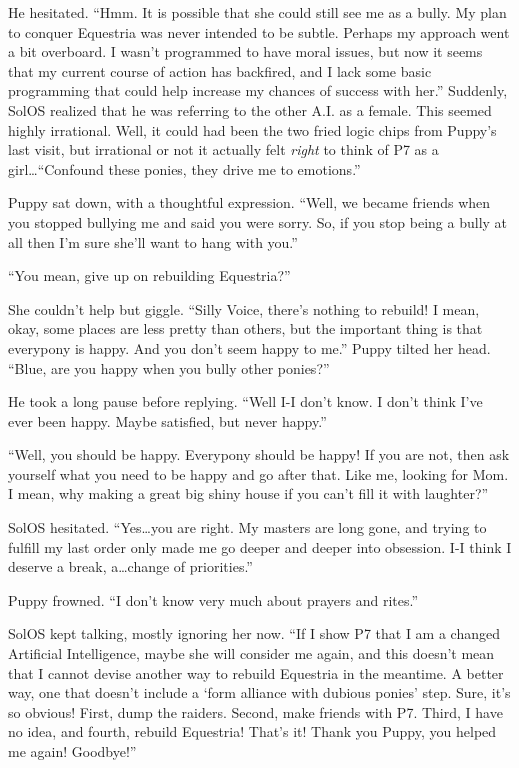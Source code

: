 He hesitated. ``Hmm. It is possible that she could still see me as a bully. My plan to conquer Equestria was never intended to be subtle. Perhaps my approach went a bit overboard. I wasn't programmed to have moral issues, but now it seems that my current course of action has backfired, and I lack some basic programming that could help increase my chances of success with her.'' Suddenly, SolOS realized that he was referring to the other A.I. as a female. This seemed highly irrational. Well, it could had been the two fried logic chips from Puppy's last visit, but irrational or not it actually felt \emph{right}\/ to think of P7 as a girl\dots ``Confound these ponies, they drive me to emotions.''

Puppy sat down, with a thoughtful expression. ``Well, we became friends when you stopped bullying me and said you were sorry. So, if you stop being a bully at all then I'm sure she'll want to hang with you.''

``You mean, give up on rebuilding Equestria?''

She couldn't help but giggle. ``Silly Voice, there's nothing to rebuild! I mean, okay, some places are less pretty than others, but the important thing is that everypony is happy. And you don't seem happy to me.'' Puppy tilted her head. ``Blue, are you happy when you bully other ponies?''

He took a long pause before replying. ``Well I-I don't know. I don't think I've ever been happy. Maybe satisfied, but never happy.''

``Well, you should be happy. Everypony should be happy! If you are not, then ask yourself what you need to be happy and go after that. Like me, looking for Mom. I mean, why making a great big shiny house if you can't fill it with laughter?''

SolOS hesitated. ``Yes\dots you are right. My masters are long gone, and trying to fulfill my last order only made me go deeper and deeper into obsession. I-I think I deserve a break, a\dots change of priorities.''

Puppy frowned. ``I don't know very much about prayers and rites.''

SolOS kept talking, mostly ignoring her now. ``If I show P7 that I am a changed Artificial Intelligence, maybe she will consider me again, and this doesn't mean that I cannot devise another way to rebuild Equestria in the meantime. A better way, one that doesn't include a `form alliance with dubious ponies' step. Sure, it's so obvious! First, dump the raiders. Second, make friends with P7. Third, I have no idea, and fourth, rebuild Equestria! That's it! Thank you Puppy, you helped me again! Goodbye!''

